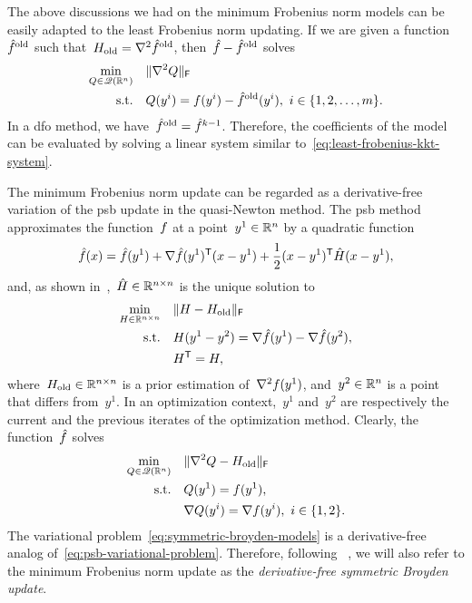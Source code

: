 The above discussions we had on the minimum Frobenius norm models can be easily adapted to the least Frobenius norm updating.
If we are given a function~$\objm[\text{old}]$ such that~$H_{\text{old}} = \nabla^2 \objm[\text{old}]$, then~$\objm - \objm[\text{old}]$ solves
\begin{subequations}
    \label{eq:symmetric-broyden-models-reformulation}
    \begin{align}
        \min_{Q \in \qpoly} & \quad \norm{\nabla^2 Q}_{\mathsf{F}}\\
        \text{s.t.}         & \quad Q(y^i) = \obj(y^i) - \objm[\text{old}](y^i), ~ i \in \set{1, 2, \dots, m}.
    \end{align}
\end{subequations}
In a \gls{dfo} method, we have~$\objm[\text{old}] = \objm[k - 1]$.
Therefore, the coefficients of the model can be evaluated by solving a linear system similar to~\cref{eq:least-frobenius-kkt-system}.

The minimum Frobenius norm update can be regarded as a derivative-free variation of the \gls{psb} update in the quasi-Newton method.
The \gls{psb} method~\cite{Powell_1970b} approximates the function~$f$ at a point~$y^1 \in \mathbb{R}^n$ by a quadratic function
\begin{align*}
    \objm(\iter) = \objm(y^1) + \nabla \objm(y^1)^{\T} (\iter - y^1) + \frac{1}{2} (\iter - y^1)^{\T} \hat{H} (\iter - y^1),
\end{align*}
and, as shown in~\cite[Thm.~4.2]{Dennis_Schnabel_1979},~$\hat{H} \in \mathbb{R}^{n \times n}$ is the unique solution to
\begin{align*}
    \min_{H \in \R^{n \times n}}    & \quad \norm{H - H_{\text{old}}}_{\mathsf{F}}\\
    \text{s.t.}                     & \quad H (y^1 - y^2) = \nabla \objm(y^1) - \nabla \objm(y^2),\\
                                    & \quad H^{\T} = H,
\end{align*}
where~$H_{\text{old}} \in \mathbb{R}^{n \times n}$ is a prior estimation of~$\nabla^2 f(y^1)$, and~$y^2 \in \mathbb{R}^n$ is a point that differs from~$y^1$.
In an optimization context,~$y^1$ and~$y^2$ are respectively the current and the previous iterates of the optimization method.
Clearly, the function~$\objm$ solves
\begin{subequations}
    \label{eq:psb-variational-problem}
    \begin{align}
        \min_{Q \in \mathscr{Q}(\mathbb{R}^n)} & \quad \lVert\nabla^2 Q - H_{\text{old}}\rVert_{\mathsf{F}}\\
        \text{s.t.}         & \quad Q(y^1) = f(y^1),\\
                            & \quad \nabla Q(y^i) = \nabla f(y^i), ~ i \in \{1, 2\}.
    \end{align}
\end{subequations}
The variational problem~\cref{eq:symmetric-broyden-models} is a derivative-free analog of~\cref{eq:psb-variational-problem}.
Therefore, following \citeauthor{Powell_2013}~\cite{Powell_2013}, we will also refer to the minimum Frobenius norm update as the \emph{derivative-free symmetric Broyden update}.

